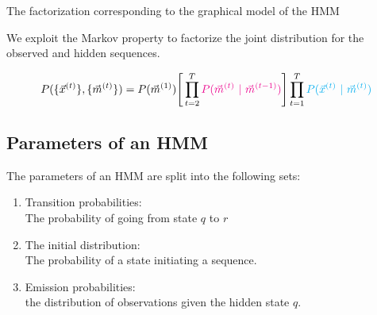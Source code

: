 \begin{frame}{The factorization corresponding to the graphical model of the HMM}



We exploit the Markov property to factorize the joint distribution for the observed and hidden sequences.

\begin{align}
P(\{\vec{x}^{(t)}\}  , \{\vec{m}^{(t)}\}) = 
		P(\vec{m}^{(1)})
		\Bigg\lbrack
		\prod_{t=2}^T
		{\color{magenta}
		P(\vec{m}^{(t)} ~|~ \vec{m}^{(t-1)})
		}
		\Bigg\rbrack
		\prod_{t=1}^T 
		{\color{cyan}
		P(\vec{x}^{(t)} ~|~ \vec{m}^{(t)})
		}
\end{align}


\end{frame}

\subsection{Parameters of an HMM}


\begin{frame}{\subsecname}

The parameters of an HMM are split into the following sets:
\begin{enumerate}
\item {Transition probabilities}:\\
The probability of going from state $q$ to $r$ 
\item The initial distribution:\\
The probability of a state initiating a sequence.  
\item Emission probabilities:\\
the distribution of observations given the hidden state $q$.  
\end{enumerate}

\end{frame}

